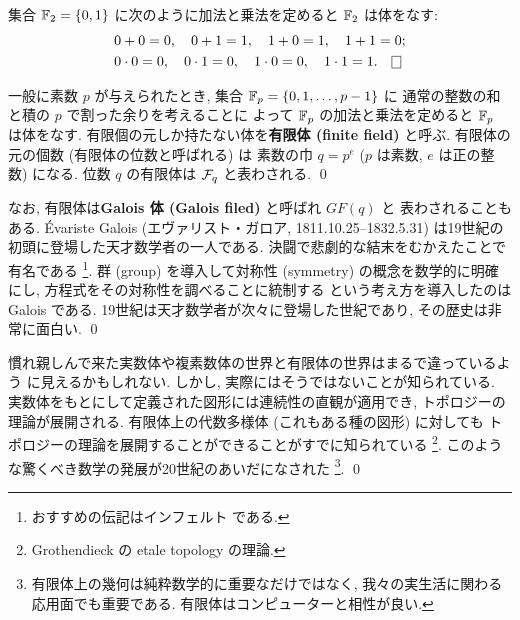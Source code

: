 \documentclass[12pt,twoside]{jarticle}
\begin{document}

\begin{question}[二元体, 5点]
  集合 ${\mathbb F}_2=\{0,1\}$ に次のように加法と乗法を定めると ${\mathbb F}_2$ は体をなす:
  \begin{align*}
    &
    0+0=0, \quad 0+1=1, \quad 1+0=1, \quad 1+1=0; 
    \\ &
    0\cdot0=0, \quad 0\cdot1=0, \quad 1\cdot0=0, \quad 1\cdot1=1.
    \qed
  \end{align*}
\end{question}

\begin{guide}[有限体]
  一般に素数 $p$ が与えられたとき, 集合 ${\mathbb F}_p=\{0,1,\ldots,p-1\}$ に
  通常の整数の和と積の $p$ で割った余りを考えることに
  よって ${\mathbb F}_p$ の加法と乗法を定めると ${\mathbb F}_p$ は体をなす.
  有限個の元しか持たない体を{\bf 有限体 (finite field)} と呼ぶ.
  有限体の元の個数 (有限体の位数と呼ばれる) は
  素数の巾 $q=p^e$ ($p$ は素数, $e$ は正の整数) になる.
  位数 $q$ の有限体は ${\mathcal F}_q$ と表わされる.
  \qed
\end{guide}

\begin{guide}[ガロア]
  なお, 有限体は{\bf Galois 体 (Galois filed)} と呼ばれ $GF(q)$ と
  表わされることもある. \'Evariste Galois (エヴァリスト・ガロア,
  1811.10.25--1832.5.31) は19世紀の初頭に登場した天才数学者の一人である.
  決闘で悲劇的な結末をむかえたことで有名である%
  \footnote{おすすめの伝記はインフェルト \cite{Infeld} である.}.
  群 (group) を導入して対称性 (symmetry) の概念を数学的に明確にし, 
  方程式をその対称性を調べることに統制する
  という考え方を導入したのは Galois である.
  19世紀は天才数学者が次々に登場した世紀であり, その歴史は非常に面白い.
  \qed
\end{guide}

\begin{guide}[有限体上の幾何]
  慣れ親しんで来た実数体や複素数体の世界と有限体の世界はまるで違っているよう
  に見えるかもしれない.  しかし, 実際にはそうではないことが知られている.
  実数体をもとにして定義された図形には連続性の直観が適用でき, 
  トポロジーの理論が展開される. 
  有限体上の代数多様体 (これもある種の図形) に対しても
  トポロジーの理論を展開することができることがすでに知られている%
  \footnote{Grothendieck の etale topology の理論.}.
  このような驚くべき数学の発展が20世紀のあいだになされた%
  \footnote{有限体上の幾何は純粋数学的に重要なだけではなく,
    我々の実生活に関わる応用面でも重要である.
    有限体はコンピューターと相性が良い.}.
  \qed
\end{guide}
\end{document}
